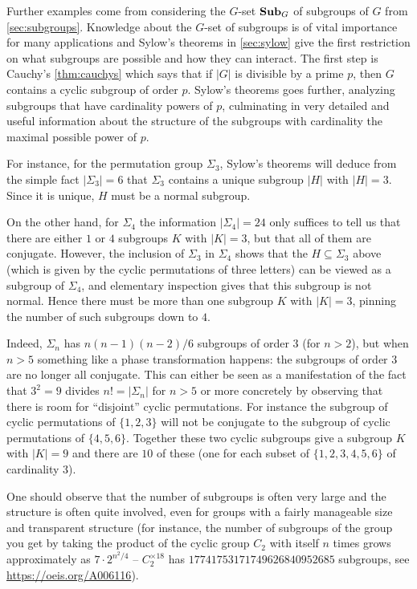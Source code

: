 Further examples come from considering the $G$-set $\mathbf{Sub}_G$ of subgroups of $G$ from \cref{sec:subgroups}.  Knowledge about the $G$-set of subgroups is of vital importance for many applications and Sylow's theorems in  \cref{sec:sylow} give the first restriction on what subgroups are possible and how they can interact.  The first step is Cauchy's \cref{thm:cauchys} which says that if $|G|$ is divisible by a prime $p$, then $G$ contains a cyclic subgroup of order $p$.  Sylow's theorems goes further, analyzing subgroups that have cardinality powers of $p$, culminating in very detailed and useful information about the structure of the subgroups with cardinality the maximal possible power of $p$.
\begin{example}
  For instance, for the permutation group $\Sigma_3$, Sylow's theorems will deduce from the simple fact $|\Sigma_3|=6$ that $\Sigma_3$ contains a unique subgroup $|H|$ with $|H|=3$.  Since it is unique, $H$ must be a normal subgroup.  

On the other hand, for $\Sigma_4$ the information $|\Sigma_4|=24$ only suffices to tell us that there are either $1$ or $4$ subgroups $K$ with $|K|=3$, but that all of them are conjugate.  However, the inclusion of $\Sigma_3$ in $\Sigma_4$ shows that the $H\subseteq\Sigma_3$ above (which is given by the cyclic permutations of three letters) can be viewed as a subgroup of $\Sigma_4$, and elementary inspection gives that this subgroup is not normal.  Hence there must be more than one subgroup $K$ with $|K|=3$, pinning the number of such subgroups down to $4$. 

Indeed, $\Sigma_n$ has $n(n-1)(n-2)/6$ subgroups of order $3$ (for $n>2$), but when $n>5$ something like a phase transformation happens: the subgroups of order $3$ are no longer all conjugate.  This can either be seen as a manifestation of the fact that $3^2=9$ divides $n!=|\Sigma_n|$ for $n>5$ or more concretely by observing that there is room for ``disjoint'' cyclic permutations.  For instance the subgroup of cyclic permutations of $\{1,2,3\}$ will not be conjugate to the subgroup of cyclic permutations of $\{4,5,6\}$.  Together these two cyclic subgroups give a subgroup $K$ with $|K|=9$ and there are $10$ of these (one for each subset of $\{1,2,3,4,5,6\}$ of cardinality $3$). 
\end{example}

\begin{remark}
  \label{rem:noofsubgps}
  One should observe that the number of subgroups is often very large and the structure is often quite involved, even for groups with a fairly manageable size and transparent structure (for instance, the number of subgroups of the group you get by taking the product of the cyclic group $C_2$ with itself $n$ times grows approximately as $7\cdot2^{n^2/4}$ -- \eg $C_2^{\times 18}$ has $17741753171749626840952685$ subgroups, see
\url{https://oeis.org/A006116}).
\end{remark}


